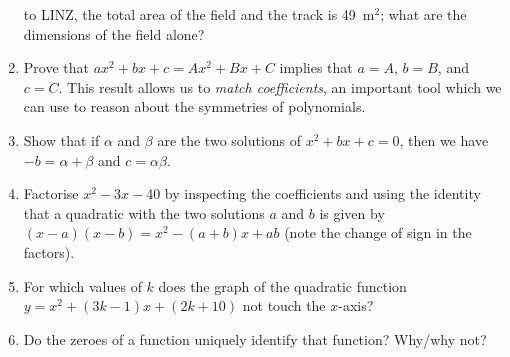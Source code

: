 \documentclass[a4paper,10pt,titlepage]{article}
\theoremstyle{definition}
\newcommand{\hard}{\refstepcounter{enumi}\item[$^\star$\theenumi.]}
\begin{document}
\begin{enumerate}
        to LINZ, the total area of the field and the track is 49~m$^2$; what are the dimensions
        of the field alone?
        \begin{center}
        \begin{minipage}[t]{.3\linewidth}
          \raggedright
        \end{minipage}
        \end{center}
  \hard Prove that $ ax^2 + bx + c = Ax^2 + Bx + C $ implies that $ a = A $, $ b = B $, and $ c = C $.
        This result allows us to \textit{match coefficients}, an important tool which we can use to
        reason about the symmetries of polynomials.
  \item Show that if $ \alpha $ and $ \beta $ are the two solutions of $ x^2 + bx + c = 0 $, then
        we have $ -b = \alpha + \beta $ and $ c = \alpha\beta $.
  \item Factorise $ x^2 - 3x - 40 $ by inspecting the coefficients and using the
        identity that a quadratic with the two solutions $ a $ and $ b $ is given
        by $ (x-a)(x-b) = x^2 -(a+b)x + ab $ (note the change of sign in the factors).
  \item For which values of $ k $ does the graph of the quadratic function
        $ y = x^2 +(3k-1)x + (2k+10) $ not touch the $ x$-axis?
  \item Do the zeroes of a function uniquely identify that function? Why/why not?

\end{enumerate}
\end{document}
